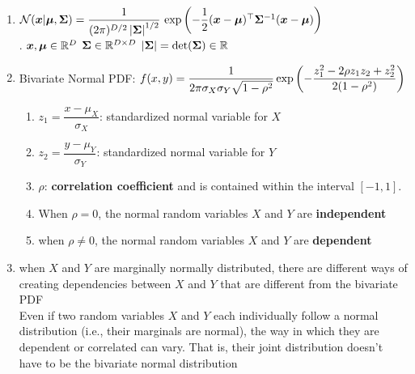 \begin{enumerate}
    \item
    $
        \mathcal{N}(\bm{x}|\bm{\mu}, \bm{\Sigma})
        = \dfrac{1}{(2\pi)^{D/2} \left| \bm{\Sigma} \right|^{1/2}} \,
        \exp\left(
            -\dfrac{1}{2}
            (\bm{x} - \bm{\mu})^\top \bm{\Sigma}^{-1} (\bm{x} - \bm{\mu})
        \right)
    $
    \hfill \cite{ml/book/Pattern-Recognition-And-Machine-Learning/Christopher-M-Bishop}
    \\[0.2cm]
    .\hfill
    $\bm{x}, \bm{\mu} \in \mathbb{R}^D$
    \hfill
    $\bm{\Sigma} \in \mathbb{R}^{D \times D}$
    \hfill
    $\left| \bm{\Sigma} \right| = \det(\bm{\Sigma}) \in \mathbb{R}$
    \hfill \cite{ml/book/Pattern-Recognition-And-Machine-Learning/Christopher-M-Bishop}

    \item Bivariate Normal PDF:
    $
        f (x, y)
        = \dfrac{1}{ 2\pi\sigma_X \sigma_Y \sqrt{1 - \rho^2} }
        \exp \left(
            - \dfrac{z^2_1 - 2\rho z_1z_2 + z^2_2 }{2(1 - \rho^2)}
        \right)
    $
    \hfill \cite{statistics/book/Statistics-for-Data-Scientists/Maurits-Kaptein}
    \begin{enumerate}
        \item $z_1 = \dfrac{x - \mu_X}{\sigma_X}$: standardized normal variable for $X$
        \hfill \cite{statistics/book/Statistics-for-Data-Scientists/Maurits-Kaptein}

        \item $z_2 = \dfrac{y - \mu_Y}{\sigma_Y}$: standardized normal variable for $Y$
        \hfill \cite{statistics/book/Statistics-for-Data-Scientists/Maurits-Kaptein}

        \item $\rho$: \textbf{correlation coefficient} and is contained within the interval $[-1, 1]$.
        \hfill \cite{statistics/book/Statistics-for-Data-Scientists/Maurits-Kaptein}

        \item When $\rho = 0$, the normal random variables $X$ and $Y$ are \textbf{independent}
        \hfill \cite{statistics/book/Statistics-for-Data-Scientists/Maurits-Kaptein}

        \item when $\rho \neq 0$, the normal random variables $X$ and $Y$ are \textbf{dependent}
        \hfill \cite{statistics/book/Statistics-for-Data-Scientists/Maurits-Kaptein}
    \end{enumerate}

    \item when $X$ and $Y$ are marginally normally distributed, there are different ways of creating dependencies between $X$ and $Y$ that are different from the bivariate PDF
    \hfill \cite{statistics/book/Statistics-for-Data-Scientists/Maurits-Kaptein}
    \\
    Even if two random variables $X$ and $Y$ each individually follow a normal distribution (i.e., their marginals are normal), the way in which they are dependent or correlated can vary.
    That is, their joint distribution doesn't have to be the bivariate normal distribution
    \hfill \cite{common/online/chatgpt}
\end{enumerate}

